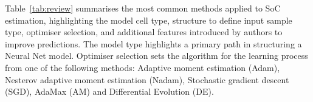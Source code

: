 %
%

%
Table~\ref{tab:review} summarises the most common methods applied to SoC estimation, highlighting the model cell type, structure to define input sample type, optimiser selection, and additional features introduced by authors to improve predictions.
The model type highlights a primary path in structuring a Neural Net model.
Optimiser selection sets the algorithm for the learning process from one of the following methods: Adaptive moment estimation (Adam), Nesterov adaptive moment estimation  (Nadam), Stochastic gradient descent (SGD), AdaMax (AM) and Differential Evolution (DE).
